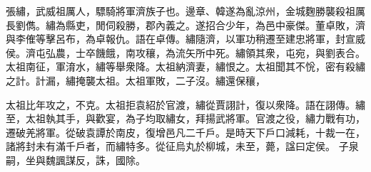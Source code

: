 \begin{pinyinscope}
 
 
 張繡，武威祖厲人，驃騎將軍濟族子也。邊章、韓遂為亂涼州，金城麴勝襲殺祖厲長劉儁。繡為縣吏，閒伺殺勝，郡內義之。遂招合少年，為邑中豪傑。董卓敗，濟與李傕等擊呂布，為卓報仇。語在卓傳。繡隨濟，以軍功稍遷至建忠將軍，封宣威侯。濟屯弘農，士卒饑餓，南攻穰，為流矢所中死。繡領其衆，屯宛，與劉表合。太祖南征，軍淯水，繡等舉衆降。太祖納濟妻，繡恨之。太祖聞其不恱，密有殺繡之計。計漏，繡掩襲太祖。太祖軍敗，二子沒。繡還保穰，
 
 
 太祖比年攻之，不克。太祖拒袁紹於官渡，繡從賈詡計，復以衆降。語在詡傳。繡至，太祖執其手，與歡宴，為子均取繡女，拜揚武將軍。官渡之役，繡力戰有功，遷破羌將軍。從破袁譚於南皮，復增邑凡二千戶。是時天下戶口減耗，十裁一在，諸將封未有滿千戶者，而繡特多。從征烏丸於柳城，未至，薨，諡曰定侯。
 子泉嗣，坐與魏諷謀反，誅，國除。
 
 
\end{pinyinscope}